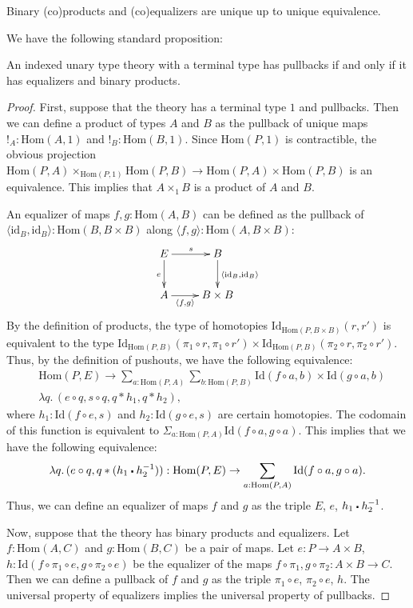 \documentclass[reqno]{mscs}
\newcommand{\fs}[1]{\mathrm{#1}}
\newcommand{\Hom}{\fs{Hom}}
\newcommand{\Id}{\fs{Id}}
\newcommand{\sym}[1]{#1^{-1}}
\newcommand{\id}{\fs{id}}
\numberwithin{figure}{section}
\newcommand{\ct}{%
  \mathchoice{\mathbin{\raisebox{0.25ex}{$\displaystyle\centerdot$}}}%
             {\mathbin{\raisebox{0.25ex}{$\centerdot$}}}%
             {\mathbin{\raisebox{0.25ex}{$\scriptstyle\,\centerdot\,$}}}%
             {\mathbin{\raisebox{0.25ex}{$\scriptscriptstyle\,\centerdot\,$}}}
}
\begin{document}
\begin{remark}
Binary (co)products and (co)equalizers are unique up to unique equivalence.
\end{remark}

We have the following standard proposition:

\begin{prop}
An indexed unary type theory with a terminal type has pullbacks if and only if it has equalizers and binary products.
\end{prop}
\begin{proof}
First, suppose that the theory has a terminal type $1$ and pullbacks.
Then we can define a product of types $A$ and $B$ as the pullback of unique maps $!_A : \Hom(A,1)$ and $!_B : \Hom(B,1)$.
Since $\Hom(P,1)$ is contractible, the obvious projection $\Hom(P,A) \times_{\Hom(P,1)} \Hom(P,B) \to \Hom(P,A) \times \Hom(P,B)$ is an equivalence.
This implies that $A \times_1 B$ is a product of $A$ and $B$.

An equalizer of maps $f,g : \Hom(A,B)$ can be defined as the pullback of $\langle \id_B, \id_B \rangle : \Hom(B, B \times B)$ along $\langle f, g \rangle : \Hom(A, B \times B)$:
\[ \xymatrix{ E \ar[r]^s \ar[d]_e & B \ar[d]^{\langle \id_B, \id_B \rangle} \\
              A \ar[r]_-{\langle f, g \rangle} & B \times B
            } \]
By the definition of products, the type of homotopies $\Id_{\Hom(P, B \times B)}(r,r')$ is equivalent to the type $\Id_{\Hom(P,B)}(\pi_1 \circ r, \pi_1 \circ r') \times \Id_{\Hom(P,B)}(\pi_2 \circ r, \pi_2 \circ r')$.
Thus, by the definition of pushouts, we have the following equivalence:
\begin{align*}
& \Hom(P,E) \to \sum_{a : \Hom(P,A)} \sum_{b : \Hom(P,B)} \Id(f \circ a, b) \times \Id(g \circ a, b) \\
& \lambda q.\,(e \circ q, s \circ q, q * h_1, q * h_2),
\end{align*}
where $h_1 : \Id(f \circ e, s)$ and $h_2 : \Id(g \circ e, s)$ are certain homotopies.
The codomain of this function is equivalent to $\Sigma_{a : \Hom(P,A)} \Id(f \circ a, g \circ a)$.
This implies that we have the following equivalence:
\[ \lambda q.\,(e \circ q, q * (h_1 \ct \sym{h_2})) : \Hom(P,E) \to \sum_{a : \Hom(P,A)} \Id(f \circ a, g \circ a). \]
Thus, we can define an equalizer of maps $f$ and $g$ as the triple $E$, $e$, $h_1 \ct \sym{h_2}$.

Now, suppose that the theory has binary products and equalizers.
Let $f : \Hom(A,C)$ and $g : \Hom(B,C)$ be a pair of maps.
Let $e : P \to A \times B$, $h : \Id(f \circ \pi_1 \circ e, g \circ \pi_2 \circ e)$ be the equalizer of the maps $f \circ \pi_1, g \circ \pi_2 : A \times B \to C$.
Then we can define a pullback of $f$ and $g$ as the triple $\pi_1 \circ e$, $\pi_2 \circ e$, $h$.
The universal property of equalizers implies the universal property of pullbacks.
\end{proof}
\end{document}
